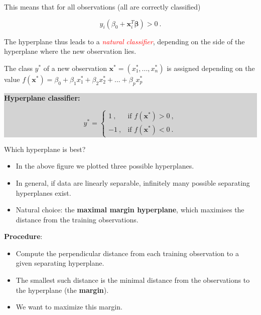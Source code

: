\documentclass[10pt,ignorenonframetext,]{beamer}
\begin{document}
\begin{frame}

This means that for all observations (all are correctly classified)

\[y_i (\beta_0+{\boldsymbol x}_i^T {\boldsymbol \beta})>0 \ .\]

\vspace{2mm} The hyperplane thus leads to a
\emph{\textcolor{red}{natural classifier}}, depending on the side of the
hyperplane where the new observation lies.

The class \(y^*\) of a new observation
\({\boldsymbol x}^*=(x_1^*,...,x_n^*)\) is assigned depending on the
value
\(f({\boldsymbol x}^*)=\beta_0+\beta_1 x_1^* + \beta_2 x_{2}^*+...+\beta_p x_{p}^*\)

\begin{center}
\colorbox{lightgray}{\begin{minipage}{8cm}
{\bf Hyperplane classifier:}

$$y^* = \left\{ \begin{array}{ll}
1 \ , & \text{if } f({\boldsymbol x}^*) >0 \ ,\\
-1 \ , & \text{if } f({\boldsymbol x}^*) < 0 \ .
\end{array}\right.$$
 \end{minipage}}
\end{center}

\end{frame}

\begin{frame}

\begin{block}{Which hyperplane is best?}

\vspace{2mm}

\begin{itemize}
\item
  In the above figure we plotted three possible hyperplanes.
\item
  In general, if data are linearly separable, infinitely many possible
  separating hyperplanes exist.
\item
  Natural choice: the \textbf{maximal margin hyperplane}, which
  maximises the distance from the training observations.
\end{itemize}

\vspace{2mm}

\textbf{Procedure}:

\begin{itemize}
\item
  Compute the perpendicular distance from each training observation to a
  given separating hyperplane.
\item
  The smallest such distance is the minimal distance from the
  observations to the hyperplane (the \textbf{margin}).
\item
  We want to maximize this margin.
\end{itemize}

\end{block}

\end{frame}
\end{document}
